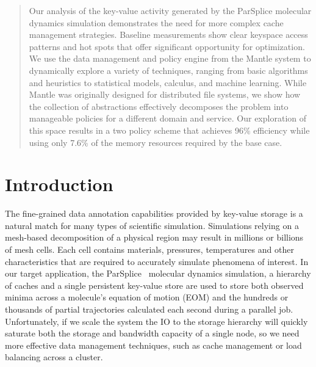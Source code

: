 \begin{abstract}

Our analysis of the key-value activity generated by the ParSplice molecular
dynamics simulation demonstrates the need for more complex cache management
strategies. Baseline measurements show clear keyspace access patterns and hot
spots that offer significant opportunity for optimization. We use the data
management and policy engine from the Mantle system to dynamically explore a
variety of techniques, ranging from basic algorithms and heuristics to
statistical models, calculus, and machine learning. While Mantle was originally
designed for distributed file systems, we show how the collection of
abstractions effectively decomposes the problem into manageable policies for a
different domain and service.  Our exploration of this space results in a two
policy scheme that achieves 96\% efficiency while using only 7.6\% of the
memory resources required by the base case. 

\end{abstract}

\section{Introduction}

The fine-grained data annotation capabilities provided by key-value storage is
a natural match for many types of scientific simulation. Simulations relying on
a mesh-based decomposition of a physical region may result in millions or
billions of mesh cells. Each cell contains materials, pressures, temperatures
and other characteristics that are required to accurately simulate phenomena of
interest. In our target application, the
ParSplice~\cite{perez:jctc20150parsplice} molecular dynamics simulation, a
hierarchy of caches and a single persistent key-value store are used to store
both observed minima across a molecule's equation of motion (EOM) and the
hundreds or thousands of partial trajectories calculated each second during a
parallel job. Unfortunately, if we scale the system the IO to the storage
hierarchy will quickly saturate both the storage and bandwidth capacity of a
single node, so we need more effective data management techniques, such as
cache management or load balancing across a cluster.

